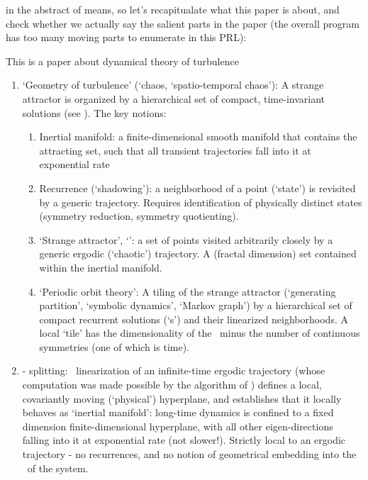 \begin{description}
{in the abstract of  means, so let's recapitualate what
this paper is about, and check whether we actually say the salient parts
in the paper (the overall program has too many moving parts to enumerate
in this PRL):

This is a paper about dynamical theory of turbulence
\begin{enumerate}
  \item
`Geometry of turbulence' (`chaos, `spatio-temporal chaos'):
A strange attractor is organized by a hierarchical set of compact,
time-invariant solutions
(see ). The key notions:
    \begin{enumerate}
      \item Inertial manifold: a finite-dimensional smooth manifold that
      contains the attracting set, such that all transient trajectories fall into
      it at exponential rate
      \item Recurrence (`shadowing'): a neighborhood of a point (`state')
      is revisited by a generic trajectory. Requires identification of
      physically distinct states (symmetry reduction, symmetry
      quotienting).
      \item `Strange attractor', `\nws': a set of points visited
      arbitrarily closely by a generic ergodic (`chaotic') trajectory. A
      (fractal dimension) set contained within the inertial manifold.
      \item `Periodic orbit theory':
      A tiling of the strange attractor (`generating partition',
      `symbolic dynamics', `Markov graph') by a hierarchical set of
      compact recurrent solutions (`\po s') and their linearized
      neighborhoods. A local `tile' has the dimensionality of the
      \statesp\ minus the number of continuous symmetries (one of which
      is time).
    \end{enumerate}
  \item
  {\Entangled}-{\transient} splitting: \cLvs\ linearization of an
  infinite-time ergodic trajectory (whose computation was made possible
  by the algorithm of ) defines a local,
  covariantly moving {\entangled} (`physical') hyperplane, and
  establishes that it locally behaves as `inertial manifold': long-time
  dynamics is confined to a fixed dimension finite-dimensional
  hyperplane, with all other eigen-directions falling into it at
  exponential rate (not slower!). Strictly local to an ergodic trajectory
  - no recurrences, and no notion of geometrical embedding into the
  \statesp\ of the system.

\end{enumerate}}
\end{description}
